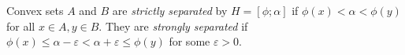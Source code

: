 Convex sets $A$ and $B$ are \emph{strictly separated} by $H = [\phi; \alpha]$ if $\phi(x) < \alpha < \phi(y)$ for all $x \in A, y \in B$. They are \emph{strongly separated} if $\phi(x) \leqslant \alpha - \varepsilon < \alpha + \varepsilon \leqslant \phi(y)$ for some $\varepsilon > 0$.
